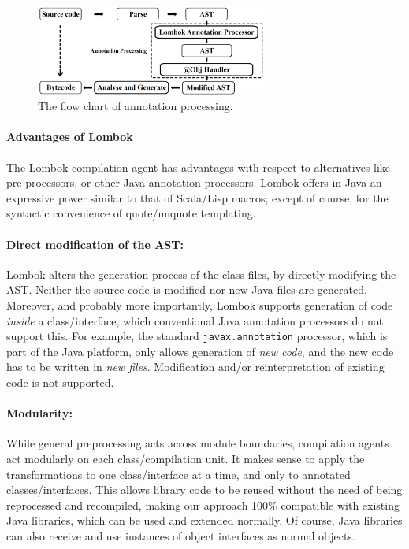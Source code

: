  

\begin{figure}[t]
\centering
\includegraphics[width=3in]{pdfs/lombok3.png}
\caption{The flow chart of \mixin annotation processing.
}
\label{fig:lombok}
\end{figure}


\paragraph{Advantages of Lombok}
The Lombok compilation agent has advantages with respect to alternatives like
pre-processors, or other Java annotation processors.
Lombok offers in Java an expressive power similar to that of Scala/Lisp macros;
except of course, for the syntactic convenience of quote/unquote templating.


\paragraph{Direct modification of the AST:}
Lombok alters the generation process of the class files,
by directly modifying the AST. Neither the source code is modified nor
new Java files are generated. Moreover, and probably more importantly,
Lombok supports generation of code \emph{inside} a class/interface,
which conventional Java annotation processors do not support this. For
example, the standard \texttt{javax.annotation} processor, which is part of the
Java platform, only allows generation of \emph{new code}, and the
new code has to be written in \emph{new files}. Modification and/or
reinterpretation of existing code is not supported.

\paragraph{Modularity:}
While general preprocessing acts across module boundaries, compilation
agents act modularly on each class/compilation unit. It makes sense to
apply the transformations to one class/interface at a time, and only to
annotated classes/interfaces. This allows library code to be reused
without the need of being reprocessed and recompiled, making our
approach 100\% compatible with existing Java libraries, which can be
used and extended normally. Of course, Java libraries can also receive
and use instances of object interfaces as normal objects.

